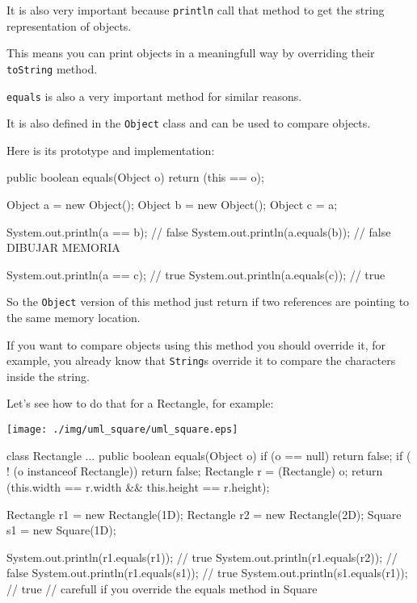 \documentclass[a4paper, 9pt]{extarticle}
\begin{document}
It is also very important because \texttt{println} call that method to get the
string representation of objects.

This means you can print objects in a meaningfull way by overriding their
\texttt{toString} method.

\texttt{equals} is also a very important method for similar reasons.

It is also defined in the \texttt{Object} class and can be used to compare
objects.

Here is its prototype and implementation:

\begin{blackboard}
  public boolean equals(Object o) {
    return (this == o);
  }

  Object a = new Object();
  Object b = new Object();
  Object c = a;

  System.out.println(a == b);      // false
  System.out.println(a.equals(b)); // false               DIBUJAR MEMORIA

  System.out.println(a == c);      // true
  System.out.println(a.equals(c)); // true
\end{blackboard}

So the \texttt{Object} version of this method just return if two references are
pointing to the same memory location.

If you want to compare objects using this method you should override it,
for example, you already know that \texttt{String}s override it to compare the
characters inside the string.

Let's see how to do that for a Rectangle, for example:

\begin{center}
  \texttt{[image: ./img/uml\_square/uml\_square.eps]}
\end{center}

\begin{blackboard}
class Rectangle {
  ...
  public boolean equals(Object o) {
    if (o == null) {
      return false;
    }
    if ( ! (o instanceof Rectangle)) {
      return false;
    }
    Rectangle r = (Rectangle) o;
    return (this.width == r.width && this.height == r.height);
  }
}

  Rectangle r1 = new Rectangle(1D);
  Rectangle r2 = new Rectangle(2D);
  Square s1 = new Square(1D);

  System.out.println(r1.equals(r1)); // true
  System.out.println(r1.equals(r2)); // false
  System.out.println(r1.equals(s1)); // true
  System.out.println(s1.equals(r1)); // true
  // carefull if you override the equals method in Square
\end{blackboard}
\end{document}
